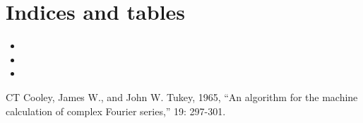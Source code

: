 \documentclass[letterpaper,10pt,english]{sphinxmanual}
\begin{document}
\chapter{Indices and tables}
\label{\detokenize{index:indices-and-tables}}\begin{itemize}
\item {} 

\item {} 

\item {} 

\end{itemize}

\begin{sphinxthebibliography}{CT}
Cooley, James W., and John W. Tukey, 1965, “An algorithm for the
machine calculation of complex Fourier series,” 
19: 297-301.
\end{sphinxthebibliography}


\renewcommand{\indexname}{Python Module Index}
\begin{sphinxtheindex}
\let\bigletter\sphinxstyleindexlettergroup
\bigletter{c}
\item\relax{}
\indexspace
\bigletter{p}
\item\relax{}
\item\relax{}
\item\relax{}
\item\relax{}
\item\relax{}
\end{sphinxtheindex}

\renewcommand{\indexname}{Index}
\printindex
\end{document}
